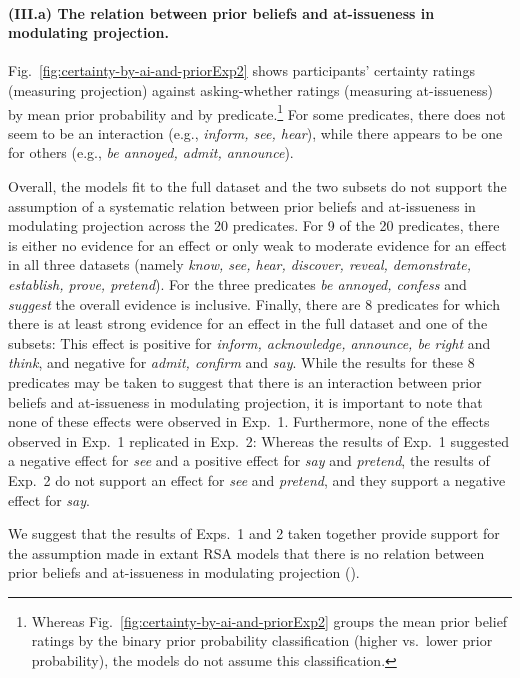 \documentclass[11pt,fleqn]{article}
\newcommand{\6}{\mbox{$[\hspace*{-.6mm}[$}}
\newcommand{\9}{\mbox{$]\hspace*{-.6mm}]$}}
\begin{document}
\paragraph{(III.a) The relation between prior beliefs and at-issueness in modulating projection.} Fig.~\ref{fig:certainty-by-ai-and-priorExp2} shows participants' certainty ratings (measuring projection) against asking-whether ratings (measuring at-issueness) by mean prior probability and by predicate.\footnote{Whereas Fig.~\ref{fig:certainty-by-ai-and-priorExp2} groups the mean prior belief ratings by the binary prior probability classification (higher vs.\ lower prior probability), the models  do not assume this classification.} For some predicates, there does not seem to be an interaction (e.g., {\em inform, see, hear}), while there appears to be one for others  (e.g., {\em be annoyed, admit, announce}). 

Overall, the models fit to the full dataset and the two subsets do not support the assumption of a systematic relation between prior beliefs and at-issueness in modulating projection across the 20 predicates. For 9 of the 20 predicates, there is either no evidence for an effect or only weak to moderate evidence for an effect in all three datasets (namely {\em know, see, hear, discover, reveal, demonstrate, establish, prove, pretend}). For the three predicates {\em be annoyed, confess} and {\em suggest} the overall evidence is inclusive.  Finally, there are 8 predicates for which there is at least strong evidence for an effect in the full dataset and one of the subsets: This effect is positive for {\em inform, acknowledge, announce, be right} and {\em think}, and negative for {\em admit, confirm} and {\em say}. While the results for these 8 predicates may be taken to suggest that there is an interaction between prior beliefs and at-issueness in modulating projection, it is important to note that none of these effects were observed in Exp.~1. Furthermore, none of the effects observed in Exp.~1 replicated in Exp.~2: Whereas the results of Exp.~1 suggested a negative effect for {\em see} and a positive effect for {\em say} and {\em pretend}, the results of Exp.~2 do not support an effect for {\em see} and {\em pretend}, and they support a negative effect for {\em say}. 

We suggest that the results of Exps.~1 and 2 taken together provide support for the assumption made in extant RSA models that there is no relation between prior beliefs and at-issueness in modulating projection (\citealt{qing-etal2016,stevens-etal2017,warstadt2022,pan-degen2023}). 
\end{document}
